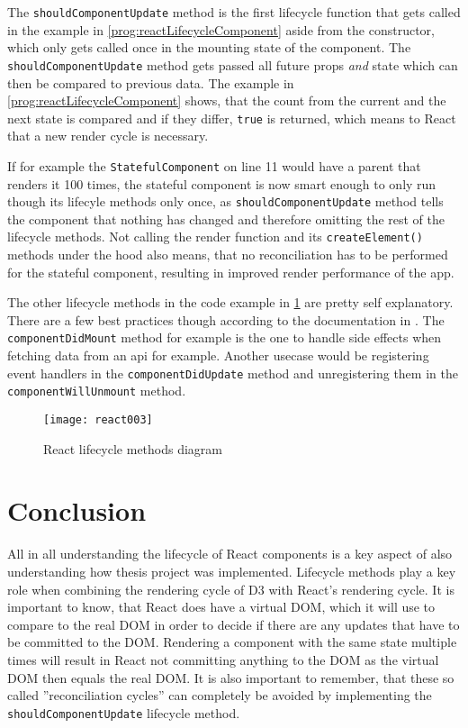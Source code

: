 The \texttt{shouldComponentUpdate} method is the first lifecycle function that gets called in the example in \ref{prog:reactLifecycleComponent} aside from the constructor, which only gets called once in the mounting state of the component. The \texttt{shouldComponentUpdate} method gets passed all future props \emph{and} state which can then be compared to previous data. The example in \ref{prog:reactLifecycleComponent} shows, that the count from the current and the next state is compared and if they differ, \texttt{true} is returned, which means to React that a new render cycle is necessary. 

If for example the \texttt{StatefulComponent} on line 11 would have a parent that renders it 100 times, the stateful component is now smart enough to only run though its lifecyle methods only once, as \texttt{shouldComponentUpdate} method tells the component that nothing has changed and therefore omitting the rest of the lifecycle methods. Not calling the render function and its \texttt{createElement()} methods under the hood also means, that no reconciliation has to be performed for the stateful component, resulting in improved render performance of the app.

The other lifecycle methods in the code example in \ref{fig:reactLifecycleMethods} are pretty self explanatory. There are a few best practices though according to the documentation in \cite{React}. The \texttt{componentDidMount} method for example is the one to handle side effects when fetching data from an api for example. Another usecase would be registering event handlers in the \texttt{componentDidUpdate} method and unregistering them in the \texttt{componentWillUnmount} method.

\begin{figure}
  \centering
  \texttt{[image: react003]}
  \caption{React lifecycle methods diagram}
  \label{fig:reactLifecycleMethods}
\end{figure}

\section{Conclusion}

All in all understanding the lifecycle of React components is a key aspect of also understanding how thesis project was implemented. Lifecycle methods play a key role when combining the rendering cycle of D3 with React's rendering cycle. It is important to know, that React does have a virtual DOM, which it will use to compare to the real DOM in order to decide if there are any updates that have to be committed to the DOM. Rendering a component with the same state multiple times will result in React not committing anything to the DOM as the virtual DOM then equals the real DOM. It is also important to remember, that these so called ''reconciliation cycles'' can completely be avoided by implementing the \texttt{shouldComponentUpdate} lifecycle method.

